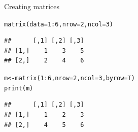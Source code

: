 \documentclass[xcolor=table,           xcolor=dvipsnames]{beamer}\usepackage[]{graphicx}\usepackage[]{color}
\makeatletter
\newcommand{\hlnum}[1]{\textcolor[rgb]{0,0,0}{#1}}
\newcommand{\hlopt}[1]{\textcolor[rgb]{0,0,0}{#1}}
\newcommand{\hlstd}[1]{\textcolor[rgb]{0,0,0}{#1}}
\newcommand{\hlkwb}[1]{\textcolor[rgb]{0,0,0}{#1}}
\newcommand{\hlkwc}[1]{\textcolor[rgb]{1,0,1}{#1}}
\newcommand{\hlkwd}[1]{\textcolor[rgb]{0,0,1}{#1}}
\newenvironment{kframe}{%
 \def\at@end@of@kframe{}%
 \ifinner\ifhmode%
  \def\at@end@of@kframe{\end{minipage}}%
  \begin{minipage}{\columnwidth}%
 \fi\fi%
 \def\FrameCommand##1{\hskip\@totalleftmargin \hskip-\fboxsep
 \colorbox{shadecolor}{##1}\hskip-\fboxsep
     \hskip-\linewidth \hskip-\@totalleftmargin \hskip\columnwidth}%
 \MakeFramed {\advance\hsize-\width
   \@totalleftmargin\z@ \linewidth\hsize
   \@setminipage}}%
 {\par\unskip\endMakeFramed%
 \at@end@of@kframe}
\newenvironment{knitrout}{}{} %
\makeatother
\begin{document}
\begin{frame}[fragile]{Creating matrices}
\begin{knitrout}
\color{fgcolor}\begin{kframe}
\begin{alltt}
\hlkwd{matrix}\hlstd{(}\hlkwc{data}\hlstd{=}\hlnum{1}\hlopt{:}\hlnum{6} \hlstd{,} \hlkwc{nrow}\hlstd{=}\hlnum{2}\hlstd{,} \hlkwc{ncol}\hlstd{=}\hlnum{3}\hlstd{)}
\end{alltt}
\begin{verbatim}
##      [,1] [,2] [,3]
## [1,]    1    3    5
## [2,]    2    4    6
\end{verbatim}
\end{kframe}
\end{knitrout}
\begin{knitrout}
\color{fgcolor}\begin{kframe}
\begin{alltt}
\hlstd{m} \hlkwb{<-} \hlkwd{matrix}\hlstd{(}\hlnum{1}\hlopt{:}\hlnum{6} \hlstd{,} \hlkwc{nrow}\hlstd{=}\hlnum{2}\hlstd{,} \hlkwc{ncol}\hlstd{=}\hlnum{3}\hlstd{,} \hlkwc{byrow}\hlstd{=T)}
\hlkwd{print}\hlstd{(m)}
\end{alltt}
\begin{verbatim}
##      [,1] [,2] [,3]
## [1,]    1    2    3
## [2,]    4    5    6
\end{verbatim}
\end{kframe}
\end{knitrout}
\end{frame}

\end{document}
